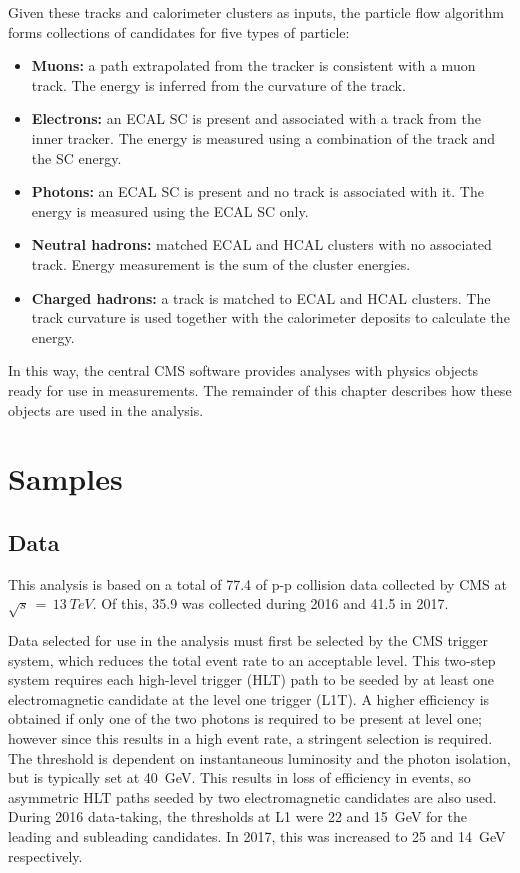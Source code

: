 Given these tracks and calorimeter clusters as inputs, the particle flow algorithm forms collections of candidates for five types of particle:
\begin{itemize}
  \item{\textbf{Muons:} a path extrapolated from the tracker is consistent with a muon track. 
                        The energy is inferred from the curvature of the track.}  %
  \item{\textbf{Electrons:} an ECAL SC is present and associated with a track from the inner tracker. 
                            The energy is measured using a combination of the track \pt and the SC energy.}
  \item{\textbf{Photons:} an ECAL SC is present and no track is associated with it.
                          The energy is measured using the ECAL SC only.}
  \item{\textbf{Neutral hadrons:} matched ECAL and HCAL clusters with no associated track.
                                 Energy measurement is the sum of the cluster energies.}
  \item{\textbf{Charged hadrons:} a track is matched to ECAL and HCAL clusters.
                                 The track curvature is used together with the calorimeter deposits to calculate the energy.}
\end{itemize}
In this way, the central CMS software provides analyses with physics objects 
ready for use in measurements.
The remainder of this chapter describes how these objects are used in the \Hgg analysis.

\section{Samples}
\subsection{Data}

This analysis is based on a total of \SI{77.4}{\fbinv} of p-p collision data collected by CMS at $\sqrt{s}\,=\,\SI{13}{TeV}$.
Of this, \SI{35.9}{\fbinv} was collected during 2016 and \SI{41.5}{\fbinv} in 2017.

Data selected for use in the analysis must first be selected by the CMS trigger system, 
which reduces the total event rate to an acceptable level.
This two-step system requires each high-level trigger (HLT) path to be seeded by at least one electromagnetic candidate at the level one trigger (L1T).
A higher efficiency is obtained if only one of the two photons is required to be present at level one; 
however since this results in a high event rate, a stringent \pt selection is required.
The threshold is dependent on instantaneous luminosity and the photon isolation, 
but is typically set at \SI{40}{GeV}.
This results in loss of efficiency in \Hgg events, so asymmetric HLT paths seeded by two electromagnetic candidates are also used.
During 2016 data-taking, the \pt thresholds at L1 were 22 and \SI{15}{GeV} for the leading and subleading candidates.
In 2017, this was increased to 25 and \SI{14}{GeV} respectively. %

